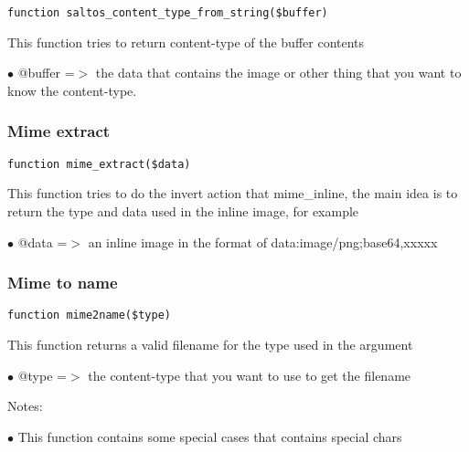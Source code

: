 \documentclass[a4paper]{article}
\begin{document}
\begin{lstlisting}
function saltos_content_type_from_string($buffer)
\end{lstlisting}

This function tries to return content-type of the buffer contents

\begin{compactitem}
\item[\color{myblue}$\bullet$] @buffer =$>$ the data that contains the image or other thing that you want to know
           the content-type.
\end{compactitem}

\hypertarget{toc181}{}
\subsubsection{Mime extract}

\begin{lstlisting}
function mime_extract($data)
\end{lstlisting}

This function tries to do the invert action that mime\_inline, the main idea
is to return the type and data used in the inline image, for example

\begin{compactitem}
\item[\color{myblue}$\bullet$] @data =$>$ an inline image in the format of data:image/png;base64,xxxxx
\end{compactitem}

\hypertarget{toc182}{}
\subsubsection{Mime to name}

\begin{lstlisting}
function mime2name($type)
\end{lstlisting}

This function returns a valid filename for the type used in the argument

\begin{compactitem}
\item[\color{myblue}$\bullet$] @type =$>$ the content-type that you want to use to get the filename
\end{compactitem}

Notes:

\begin{compactitem}
\item[\color{myblue}$\bullet$] This function contains some special cases that contains special chars
\end{compactitem}
\end{document}
